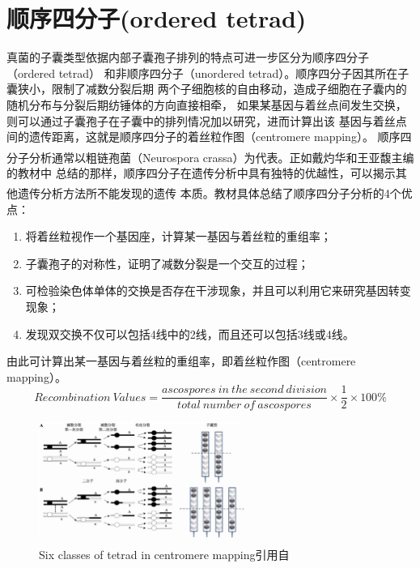 \documentclass[]{LZUThesis}
\newcommand{\upcite}[1]{\textsuperscript{\textsuperscript{\cite{#1}}}}
\begin{document}
\section{顺序四分子(ordered tetrad)}
真菌的子囊类型依据内部子囊孢子排列的特点可进一步区分为顺序四分子（ordered tetrad）
和非顺序四分子（unordered tetrad）。顺序四分子因其所在子囊狭小，限制了减数分裂后期
两个子细胞核的自由移动，造成子细胞在子囊内的随机分布与分裂后期纺锤体的方向直接相牵，
如果某基因与着丝点间发生交换，则可以通过子囊孢子在子囊中的排列情况加以研究，进而计算出该
基因与着丝点间的遗传距离，这就是顺序四分子的着丝粒作图（centromere mapping）。
顺序四分子分析通常以粗链孢菌（Neurospora crassa）为代表\upcite{YCZZ201911008}。正如戴灼华和王亚馥主编的教材中
总结的那样，顺序四分子在遗传分析中具有独特的优越性，可以揭示其他遗传分析方法所不能发现的遗传
本质\upcite{dai2016}。教材具体总结了顺序四分子分析的4个优点：\par
\begin{enumerate}
    \item 将着丝粒视作一个基因座，计算某一基因与着丝粒的重组率；\par
    \item 子囊孢子的对称性，证明了减数分裂是一个交互的过程；\par
    \item 可检验染色体单体的交换是否存在干涉现象，并且可以利用它来研究基因转变现象；\par
    \item 发现双交换不仅可以包括4线中的2线，而且还可以包括3线或4线。\par
\end{enumerate}
由此可计算出某一基因与着丝粒的重组率，即着丝粒作图（centromere mapping）。
\begin{equation}\label{eq:1}
Recombination~Values = \frac{ascospores~in~the~second~division}
{total~number~of~ascospores}\times \frac{1}{2}\times 100\%
\end{equation}
\begin{figure}[htbp]
    \centering
    \includegraphics[width=0.6\textwidth]{img/7orderedtetrad}
    \caption{Six classes of tetrad in centromere mapping引用自\upcite{YCZZ201911008}}
    \label{fig:2}
\end{figure}
\end{document}

